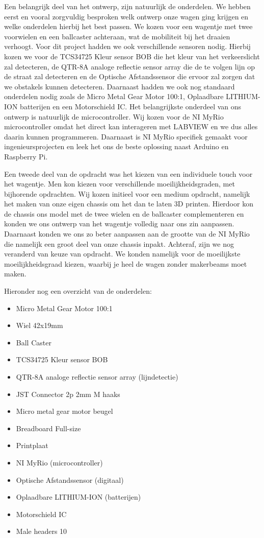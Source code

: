 \documentclass[kulak]{kulakarticle} %
\begin{document}
Een belangrijk deel van het ontwerp, zijn natuurlijk de onderdelen. We hebben eerst en vooral zorgvuldig besproken welk ontwerp onze wagen ging krijgen en welke onderdelen hierbij het best passen. We kozen voor een wagentje met twee voorwielen en een ballcaster achteraan, wat de mobiliteit bij het draaien verhoogt. Voor dit project hadden we ook verschillende sensoren nodig. Hierbij kozen we voor de TCS34725 Kleur sensor BOB die het kleur van het verkeerslicht zal detecteren, de QTR-8A analoge reflectie sensor array die de te volgen lijn op de straat zal detecteren en de Optische Afstandssensor die ervoor zal zorgen dat we obstakels kunnen detecteren. Daarnaast hadden we ook nog standaard onderdelen nodig zoals de Micro Metal Gear Motor 100:1, Oplaadbare LITHIUM-ION batterijen en een Motorschield IC. Het belangrijkste onderdeel van ons ontwerp is natuurlijk de microcontroller. Wij kozen voor de NI MyRio microcontroller omdat het direct kan interageren met LABVIEW en we dus alles daarin kunnen programmeren. Daarnaast is NI MyRio specifiek gemaakt voor ingenieursprojecten en leek het ons de beste oplossing naast Arduino en Raspberry Pi.  


Een tweede deel van de opdracht was het kiezen van een individuele touch voor het wagentje. Men kon kiezen voor verschillende moeilijkheidsgraden, met bijhorende opdrachten. Wij kozen initieel voor een medium opdracht, namelijk het maken van onze eigen chassis om het dan te laten 3D printen. Hierdoor kon de chassis ons model met de twee wielen en de ballcaster complementeren en konden we ons ontwerp van het wagentje volledig naar ons zin aanpassen. Daarnaast konden we ons zo beter aanpassen aan de grootte van de NI MyRio die namelijk een groot deel van onze chassis inpakt. Achteraf, zijn we nog veranderd van keuze van opdracht. We konden namelijk voor de moeilijkste moeilijkheidsgraad kiezen, waarbij je heel de wagen zonder makerbeams moet maken. 

Hieronder nog een overzicht van de onderdelen:
\begin{multicols}{2}
\begin{itemize}
	\item Micro Metal Gear Motor 100:1
	\item Wiel 42x19mm
	\item Ball Caster
	\item TCS34725 Kleur sensor BOB 
	\item QTR-8A analoge reflectie sensor array (lijndetectie)
	\item JST Connector 2p 2mm M haaks
	\item Micro metal gear motor beugel
	\item Breadboard Full-size
	\item Printplaat
	\item NI MyRio (microcontroller)
	\item Optische Afstandssensor (digitaal)
	\item Oplaadbare LITHIUM-ION (batterijen)
	\item Motorschield IC
	\item Male headers 10
\end{itemize}

\end{multicols}
\end{document}

